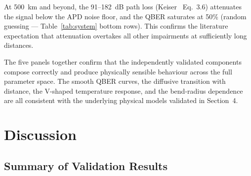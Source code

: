 \documentclass[11pt,a4paper]{article}
\begin{document}
At 500~km and beyond, the 91--182~dB path loss
(Keiser~\cite{keiser} Eq.~3.6) attenuates the signal below the APD
noise floor, and the QBER saturates at 50\% (random guessing ---
Table~\ref{tab:system} bottom rows).  This confirms the literature
expectation that attenuation overtakes all other impairments at
sufficiently long distances.

The five panels together confirm that the independently validated
components compose correctly and produce physically sensible behaviour
across the full parameter space.  The smooth QBER curves, the diffusive
transition with distance, the V-shaped temperature response, and the
bend-radius dependence are all consistent with the underlying physical
models validated in Section~4.

\section{Discussion}

\subsection{Summary of Validation Results}
\end{document}
